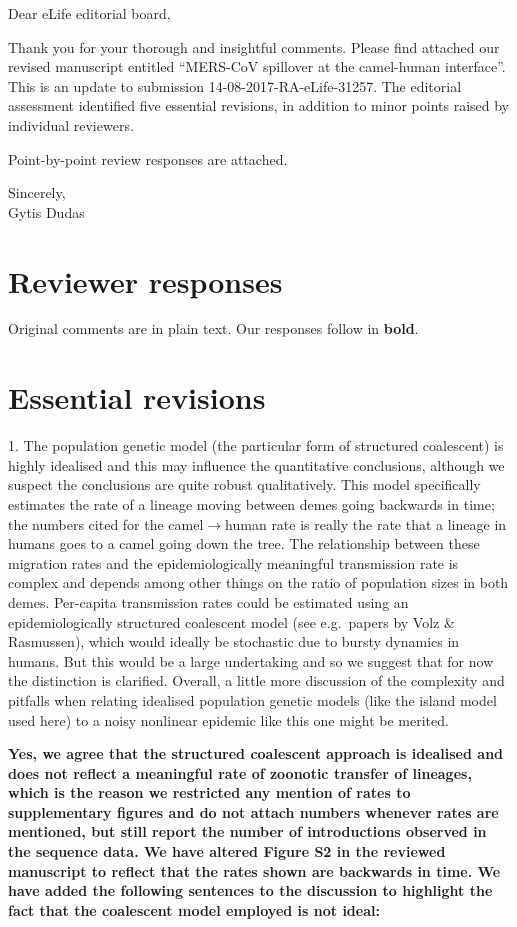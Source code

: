 \documentclass[11pt,oneside,letterpaper]{article}
\begin{document}

Dear eLife editorial board,

Thank you for your thorough and insightful comments. Please find attached our revised manuscript entitled ``MERS-CoV spillover at the camel-human interface''.  This is an update to submission 14-08-2017-RA-eLife-31257. The editorial assessment identified five essential revisions, in addition to minor points raised by individual reviewers.

Point-by-point review responses are attached.

Sincerely,\\
Gytis Dudas

\newpage

\section*{Reviewer responses}

Original comments are in plain text.  Our responses follow in \textbf{bold}.

\section*{Essential revisions}
1. The population genetic model (the particular form of structured coalescent) is highly idealised and this may influence the quantitative conclusions, although we suspect the conclusions are quite robust qualitatively. This model specifically estimates the rate of a lineage moving between demes going backwards in time; the numbers cited for the camel$\rightarrow$human rate is really the rate that a lineage in humans goes to a camel going down the tree. The relationship between these migration rates and the epidemiologically meaningful transmission rate is complex and depends among other things on the ratio of population sizes in both demes. Per-capita transmission rates could be estimated using an epidemiologically structured coalescent model (see e.g.\ papers by Volz \& Rasmussen), which would ideally be stochastic due to bursty dynamics in humans. But this would be a large undertaking and so we suggest that for now the distinction is clarified. Overall, a little more discussion of the complexity and pitfalls when relating idealised population genetic models (like the island model used here) to a noisy nonlinear epidemic like this one might be merited.

\textbf{Yes, we agree that the structured coalescent approach is idealised and does not reflect a meaningful rate of zoonotic transfer of lineages, which is the reason we restricted any mention of rates to supplementary figures and do not attach numbers whenever rates are mentioned, but still report the number of introductions observed in the sequence data. We have altered Figure S2 in the reviewed manuscript to reflect that the rates shown are backwards in time. We have added the following sentences to the discussion to highlight the fact that the coalescent model employed is not ideal:}
\end{document}
